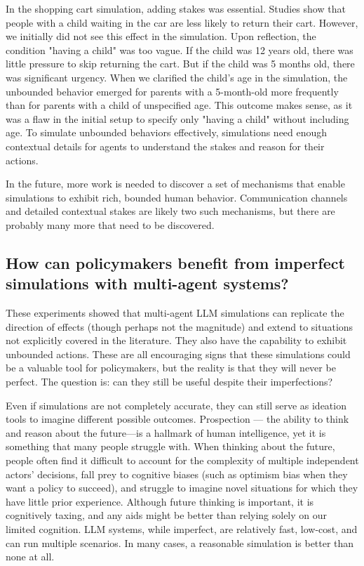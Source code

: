 In the shopping cart simulation, adding stakes was essential. Studies show that people with a child waiting in the car are less likely to return their cart. However, we initially did not see this effect in the simulation. Upon reflection, the condition "having a child" was too vague. If the child was 12 years old, there was little pressure to skip returning the cart. But if the child was 5 months old, there was significant urgency. When we clarified the child's age in the simulation, the unbounded behavior emerged for parents with a 5-month-old more frequently than for parents with a child of unspecified age. This outcome makes sense, as it was a flaw in the initial setup to specify only "having a child" without including age. To simulate unbounded behaviors effectively, simulations need enough contextual details for agents to understand the stakes and reason for their actions.

In the future, more work is needed to discover a set of mechanisms that enable simulations to exhibit rich, bounded human behavior. Communication channels and detailed contextual stakes are likely two such mechanisms, but there are probably many more that need to be discovered.

\subsection{How can policymakers benefit from imperfect simulations with multi-agent systems?}
These experiments showed that multi-agent LLM simulations can replicate the direction of effects (though perhaps not the magnitude) and extend to situations not explicitly covered in the literature. They also have the capability to exhibit unbounded actions. These are all encouraging signs that these simulations could be a valuable tool for policymakers, but the reality is that they will never be perfect. The question is: can they still be useful despite their imperfections?

Even if simulations are not completely accurate, they can still serve as ideation tools to imagine different possible outcomes. Prospection — the ability to think and reason about the future—is a hallmark of human intelligence, yet it is something that many people struggle with. When thinking about the future, people often find it difficult to account for the complexity of multiple independent actors' decisions, fall prey to cognitive biases (such as optimism bias when they want a policy to succeed), and struggle to imagine novel situations for which they have little prior experience. Although future thinking is important, it is cognitively taxing, and any aids might be better than relying solely on our limited cognition. LLM systems, while imperfect, are relatively fast, low-cost, and can run multiple scenarios. In many cases, a reasonable simulation is better than none at all.

